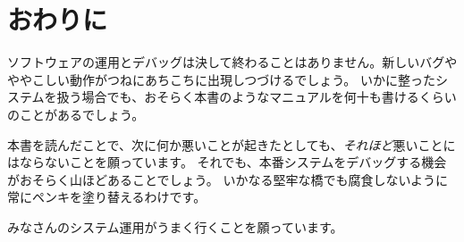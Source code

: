\chapter*{おわりに}


ソフトウェアの運用とデバッグは決して終わることはありません。新しいバグやややこしい動作がつねにあちこちに出現しつづけるでしょう。
いかに整ったシステムを扱う場合でも、おそらく本書のようなマニュアルを何十も書けるくらいのことがあるでしょう。

本書を読んだことで、次に何か悪いことが起きたとしても、\emph{それほど}悪いことにはならないことを願っています。
それでも、本番システムをデバッグする機会がおそらく山ほどあることでしょう。
いかなる堅牢な橋でも腐食しないように常にペンキを塗り替えるわけです。

みなさんのシステム運用がうまく行くことを願っています。

